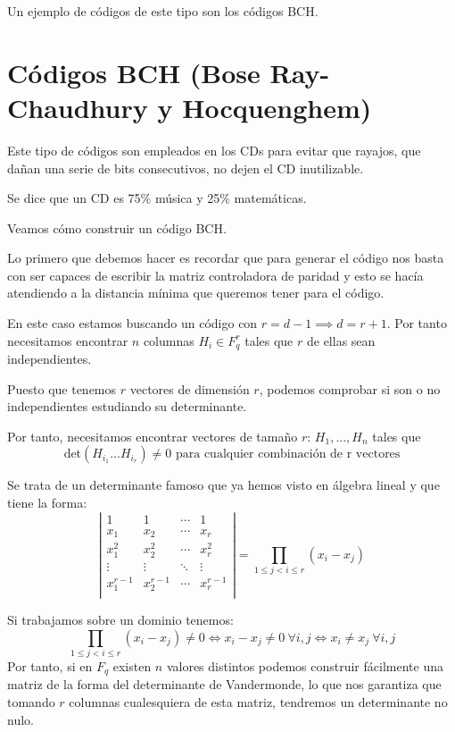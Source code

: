 Un ejemplo de códigos de este tipo son los códigos BCH.

\section{Códigos BCH (Bose Ray-Chaudhury y Hocquenghem)}

Este tipo de códigos son empleados en los CDs para evitar que rayajos, que dañan una serie de bits consecutivos, no dejen el CD inutilizable.

Se dice que un CD es 75\% música y 25\% matemáticas.

Veamos cómo construir un código BCH.

Lo primero que debemos hacer es recordar que para generar el código nos basta con ser capaces de escribir la matriz controladora de paridad y esto se hacía atendiendo a la distancia mínima que queremos tener para el código.

En este caso estamos buscando un código con $r=d-1 \implies d=r+1$. Por tanto necesitamos encontrar $n$ columnas $H_i \in F_q^r$ tales que $r$ de ellas sean independientes.

Puesto que tenemos $r$ vectores de dimensión $r$, podemos comprobar si son o no independientes estudiando su determinante.

Por tanto, necesitamos encontrar vectores de tamaño $r$: $H_1,...,H_n$ tales que
\[\text{det}(H_{i_1}...H_{i_r}) \neq 0 \text{ para cualquier combinación de r vectores}\]

\begin{defn}
Se trata de un determinante famoso que ya hemos visto en álgebra lineal y que tiene la forma:
\[\left| \begin{array}{cccc}
1 & 1 & \cdots & 1 \\
x_1 & x_2 & \cdots & x_r \\
x_1^2 & x_2^2 & \cdots & x_r^2 \\
\vdots & \vdots & \ddots & \vdots \\
x_1^{r-1} & x_2^{r-1} & \cdots & x_r^{r-1} \\
\end{array}\right| = \prod_{1 \leq j < i \leq r}(x_i-x_j)\]
\end{defn}

Si trabajamos sobre un dominio tenemos:
\[\prod_{1 \leq j < i \leq r}(x_i-x_j) \neq 0 \iff x_i-x_j \neq 0 \ \forall i,j \iff x_i\neq x_j  \ \forall i,j\]
Por tanto, si en $F_q$ existen $n$ valores distintos podemos construir fácilmente una matriz de la forma del determinante de Vandermonde, lo que nos garantiza que tomando $r$ columnas cualesquiera de esta matriz, tendremos un determinante no nulo.

